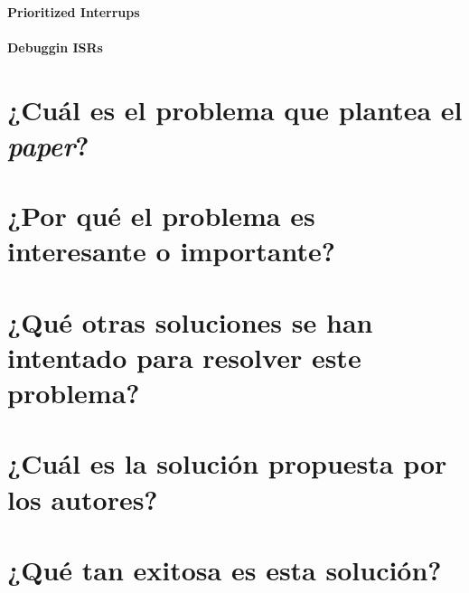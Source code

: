 \paragraph{Prioritized Interrups}

\paragraph{Debuggin ISRs}

\section{¿Cuál es el problema que plantea el \textit{paper}?}

\section{¿Por qué el problema es interesante o importante?}

\section{¿Qué otras soluciones se han intentado para resolver este problema?}     

\section{¿Cuál es la solución propuesta por los autores?}

\section{¿Qué tan exitosa es esta solución?}
